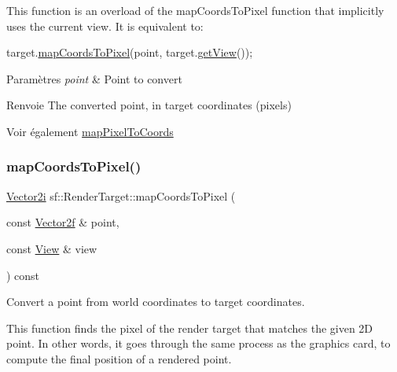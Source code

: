 This function is an overload of the map\+Coords\+To\+Pixel function that implicitly uses the current view. It is equivalent to\+: 
\begin{DoxyCode}
target.\hyperlink{classsf_1_1RenderTarget_ad92a9f0283aa5f3f67e473c1105b68cf}{mapCoordsToPixel}(point, target.\hyperlink{classsf_1_1RenderTarget_a2c179503b4dcdf5282ef6426d317602c}{getView}());
\end{DoxyCode}



\begin{DoxyParams}{Paramètres}
{\em point} & Point to convert\\
\hline
\end{DoxyParams}
\begin{DoxyReturn}{Renvoie}
The converted point, in target coordinates (pixels)
\end{DoxyReturn}
\begin{DoxySeeAlso}{Voir également}
\hyperlink{classsf_1_1RenderTarget_a0103ebebafa43a97e6e6414f8560d5e3}{map\+Pixel\+To\+Coords} 
\end{DoxySeeAlso}
\mbox{\label{classsf_1_1RenderTarget_a848eee44b72ac3f16fa9182df26e83bc}} 
\subsubsection{\texorpdfstring{map\+Coords\+To\+Pixel()}{mapCoordsToPixel()}\hspace{0.1cm}{\footnotesize\ttfamily [2/2]}}
{\footnotesize\ttfamily \hyperlink{classsf_1_1Vector2}{Vector2i} sf\+::\+Render\+Target\+::map\+Coords\+To\+Pixel (\begin{DoxyParamCaption}\item[{const \hyperlink{classsf_1_1Vector2}{Vector2f} \&}]{point,  }\item[{const \hyperlink{classsf_1_1View}{View} \&}]{view }\end{DoxyParamCaption}) const}



Convert a point from world coordinates to target coordinates. 

This function finds the pixel of the render target that matches the given 2D point. In other words, it goes through the same process as the graphics card, to compute the final position of a rendered point.

